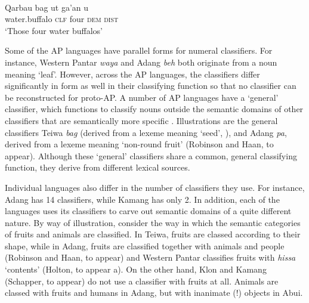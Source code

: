 {\ea%
\label{ex:1:35}
 \\
\gll Qarbau   bag   ut   ga'an   u \\
 water.buffalo  \textsc{clf}  four  \textsc{dem  dist}  \\
\glt `Those four water buffalos'   
\z 



         

Some of the AP languages have parallel forms for numeral classifiers. For instance, Western Pantar \textit{waya} and Adang \textit{beh} both originate from a noun meaning `leaf'. However, across the AP languages, the classifiers differ significantly in form as well in their classifying function so that no classifier can be reconstructed for proto-AP. A number of AP languages have a `general' classifier, which functions to classify nouns outside the semantic domains of other classifiers that are semantically more specific \citep[cf.][]{ZubinEtAl1993}. Illustrations are the general classifiers Teiwa \textit{bag} (derived from a lexeme meaning `seed', \citealt{Klamer2014,Klamertanumeral}), and Adang \textit{pa{\textglotstop}}, derived from a lexeme meaning `non-round fruit' (Robinson and Haan, to appear). Although these `general' classifiers share a common, general classifying function, they derive from different lexical sources.

Individual languages also differ in the number of classifiers they use. For instance, Adang has 14 classifiers, while Kamang has only 2.  In addition, each of the languages uses its classifiers to carve out semantic domains of a quite different nature. By way of illustration, consider the way in which the semantic categories of fruits and animals are classified. In Teiwa, fruits are classed according to their shape, while in Adang, fruits are classified together with animals and people (Robinson and Haan, to appear) and Western Pantar classifies fruits with \textit{hissa} `contents' (Holton, to appear a). On the other hand, Klon \citep{Baird2008} and Kamang (Schapper, to appear) do not use a classifier with fruits at all. Animals are classed with fruits and humans in Adang, but with inanimate (!) objects in Abui. 

}
